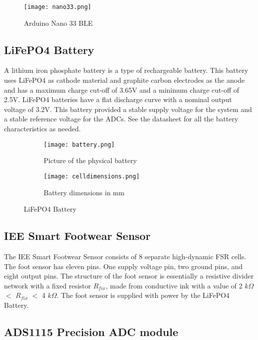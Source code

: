 \begin{figure}[!h]
    \centering
    \texttt{[image: nano33.png]}
    \caption{Arduino Nano 33 BLE}
    \label{fig:arduino}
\end{figure}


\subsection{LiFePO4 Battery}
A lithium iron phosphate battery is a type of rechargeable battery. This battery uses LiFePO4 as cathode material and graphite carbon electrodes as the anode and has a maximum charge cut-off of 3.65V and a minimum charge cut-off of 2.5V. LiFePO4 batteries have a flat discharge curve with a nominal output voltage of 3.2V. This battery provided a stable supply voltage for the system and a stable reference voltage for the ADCs. See the datasheet \cite{antbatt2019} for all the battery characteristics as needed.

\begin{figure}[h]

    \begin{subfigure}{0.5\textwidth}
    \texttt{[image: battery.png]} 
    \caption{Picture of the physical battery}
    \label{fig:subim1}
    \end{subfigure}
    \begin{subfigure}{0.6\textwidth}
    \texttt{[image: celldimensions.png]}
    \caption{Battery dimensions in mm}
    \label{fig:subim2}
    \end{subfigure}
    
    \caption{LiFePO4 Battery}
    \label{fig:image2}
    \end{figure}
\subsection{IEE Smart Footwear Sensor}

The IEE Smart Footwear Sensor consists of 8 separate high-dynamic FSR
cells. The foot sensor has eleven pins. One supply voltage pin, two ground pins, and eight output pins. The structure of the foot sensor is essentially a resistive divider network with a fixed resistor $R_{fix}$, made from conductive ink with a value of 2 $k\Omega$ $<$ $R_{fix}$ $<$ 4 $k\Omega$. The foot sensor is supplied with power by the LiFePO4 Battery.

\subsection{ADS1115 Precision ADC module}

